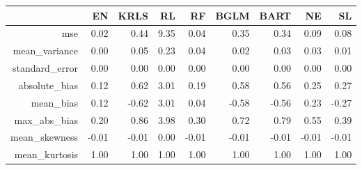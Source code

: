 \begin{table}[ht]
\centering
\begin{tabular}{rrrrrrrrr}
  \hline
 & EN & KRLS & RL & RF & BGLM & BART & NE & SL \\ 
  \hline
mse & 0.02 & 0.44 & 9.35 & 0.04 & 0.35 & 0.34 & 0.09 & 0.08 \\ 
  mean\_variance & 0.00 & 0.05 & 0.23 & 0.04 & 0.02 & 0.03 & 0.03 & 0.01 \\ 
  standard\_error & 0.00 & 0.00 & 0.00 & 0.00 & 0.00 & 0.00 & 0.00 & 0.00 \\ 
  absolute\_bias & 0.12 & 0.62 & 3.01 & 0.19 & 0.58 & 0.56 & 0.25 & 0.27 \\ 
  mean\_bias & 0.12 & -0.62 & 3.01 & 0.04 & -0.58 & -0.56 & 0.23 & -0.27 \\ 
  max\_abs\_bias & 0.20 & 0.86 & 3.98 & 0.30 & 0.72 & 0.79 & 0.55 & 0.39 \\ 
  mean\_skewness & -0.01 & -0.01 & 0.00 & -0.01 & -0.01 & -0.01 & -0.01 & -0.01 \\ 
  mean\_kurtosis & 1.00 & 1.00 & 1.00 & 1.00 & 1.00 & 1.00 & 1.00 & 1.00 \\ 
   \hline
\end{tabular}
\end{table}
